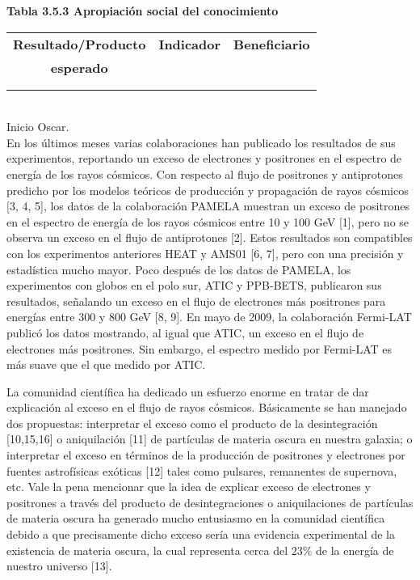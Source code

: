 \textbf{Tabla 3.5.3 Apropiación social del conocimiento}\\
\begin{tabular}{|c|c|c|}\hline
   \textbf{Resultado/Producto}&\textbf{Indicador} & \textbf{Beneficiario}\\
   \textbf{esperado}& & \\\hline
\parbox[t]{4cm}{}  & \parbox[t]{4cm}{}& \parbox[t]{4cm}{} \\\hline
   & & \\\hline
 \end{tabular}
\\
Inicio Oscar.\\
En los últimos meses varias colaboraciones han publicado los resultados de sus experimentos, 
reportando un exceso de electrones y positrones  en el espectro de energía de los rayos cósmicos. 
Con respecto al flujo de positrones y antiprotones predicho por los modelos teóricos de producción y 
propagación de rayos cósmicos [3, 4, 5], los datos de la colaboración PAMELA muestran un exceso de 
positrones en el espectro de energía de los rayos cósmicos entre 10 y 100 GeV [1], pero no se 
observa un exceso en el flujo de antiprotones [2]. Estos resultados son compatibles con los 
experimentos anteriores HEAT y AMS01  [6, 7], pero con una precisión y estadística mucho mayor. 
Poco después de los datos de PAMELA, los experimentos con globos en el polo sur, ATIC y PPB-BETS, 
publicaron sus resultados, señalando un exceso en el flujo de electrones más positrones para energías 
entre 300 y 800 GeV [8, 9]. En mayo de 2009, la colaboración Fermi-LAT publicó los datos mostrando, 
al igual que ATIC, un exceso en el flujo de electrones más positrones. Sin embargo, 
el espectro medido por Fermi-LAT es más suave que el que medido por ATIC.

La comunidad científica ha dedicado un esfuerzo enorme en tratar de dar explicación
 al exceso en el flujo de rayos cósmicos. Básicamente se han manejado dos propuestas: 
interpretar el exceso como el producto de la desintegración [10,15,16] o aniquilación [11] de partículas 
de materia oscura en nuestra galaxia; o interpretar el exceso en términos de la producción de 
positrones y electrones por fuentes astrofísicas exóticas [12] tales como pulsares, 
remanentes de supernova, etc. Vale la pena mencionar que la idea de explicar exceso 
de electrones y positrones a través del producto de desintegraciones o aniquilaciones de 
partículas de materia oscura ha generado mucho entusiasmo en la comunidad científica debido 
a que precisamente dicho exceso sería una evidencia experimental de la existencia de 
materia oscura, la cual representa cerca del $23\%$ de la energía de nuestro universo [13]. 

